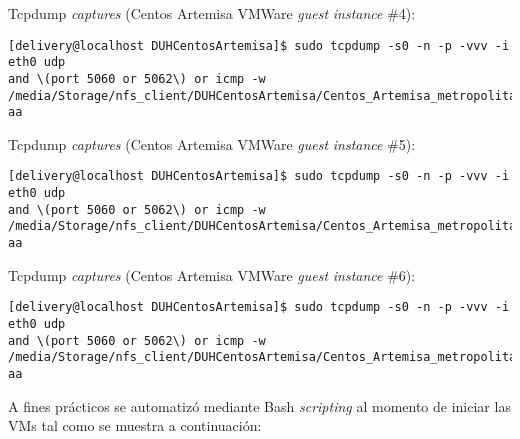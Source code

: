 \documentclass[a4paper,12pt]{report}
\newenvironment{myscriptlisting}
{\begin{list}{}{\setlength{\leftmargin}{1em}}\item\scriptsize\bfseries}
{\end{list}}
\begin{document}
Tcpdump \emph{captures} (Centos Artemisa VMWare \emph{guest} \emph{instance} \#4):
\begin{myscriptlisting}   
  \begin{verbatim}
[delivery@localhost DUHCentosArtemisa]$ sudo tcpdump -s0 -n -p -vvv -i eth0 udp
and \(port 5060 or 5062\) or icmp -w
/media/Storage/nfs_client/DUHCentosArtemisa/Centos_Artemisa_metropolitan1_dd_mm_
aa
  \end{verbatim}
\end{myscriptlisting}

Tcpdump \emph{captures} (Centos Artemisa VMWare \emph{guest} \emph{instance} \#5):
\begin{myscriptlisting}   
  \begin{verbatim}
[delivery@localhost DUHCentosArtemisa]$ sudo tcpdump -s0 -n -p -vvv -i eth0 udp
and \(port 5060 or 5062\) or icmp -w
/media/Storage/nfs_client/DUHCentosArtemisa/Centos_Artemisa_metropolitan1_dd_mm_
aa
  \end{verbatim}
\end{myscriptlisting}

Tcpdump \emph{captures} (Centos Artemisa VMWare \emph{guest} \emph{instance} \#6):
\begin{myscriptlisting}   
  \begin{verbatim}
[delivery@localhost DUHCentosArtemisa]$ sudo tcpdump -s0 -n -p -vvv -i eth0 udp
and \(port 5060 or 5062\) or icmp -w
/media/Storage/nfs_client/DUHCentosArtemisa/Centos_Artemisa_metropolitan1_dd_mm_
aa
  \end{verbatim}
\end{myscriptlisting}

A fines prácticos se automatizó mediante Bash \emph{scripting} al momento de iniciar
las VMs tal como se muestra a continuación:\\
\end{document}
